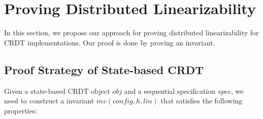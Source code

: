 
\section{Proving Distributed Linearizability}
\label{sec:proving distributed linearizability}

In this section, we propose our approach for proving distributed linearizability for CRDT implementations. Our proof is done by proving an invariant.


\subsection{Proof Strategy of State-based CRDT}
\label{subsec:proof strategy of operation-based CRDT}

Given a state-based CRDT object $\mathit{obj}$ and a sequential specification $\mathit{spec}$, we need to construct a invariant $\mathit{inv}(\mathit{config},h,\mathit{lin})$ that satisfies the following properties:


